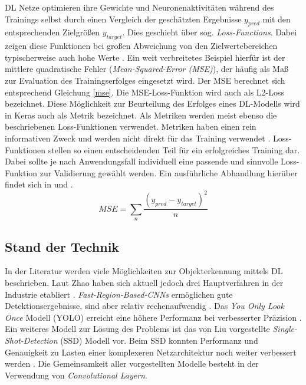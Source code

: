 DL Netze optimieren ihre Gewichte und Neuronenaktivitäten während des Trainings selbst durch einen Vergleich der geschätzten Ergebnisse $y_{pred}$ mit den entsprechenden Zielgrößen $y_{target}$. Dies geschieht über sog. \textit{Loss-Functions}. Dabei zeigen diese Funktionen bei großen Abweichung von den Zielwertebereichen typischerweise auch hohe Werte \cite[S.271-279]{Goodfellow-et-al-2016}. Ein weit verbreitetes Beispiel hierfür ist der mittlere quadratische Fehler (\textit{Mean-Squared-Error (MSE)}), der häufig als Maß zur Evaluation des Trainingserfolges eingesetzt wird. Der MSE berechnet sich entsprechend Gleichung \ref{mse}. Die MSE-Loss-Funktion wird auch als L2-Loss bezeichnet. Diese Möglichkeit zur Beurteilung des Erfolges eines DL-Modells wird in Keras auch als Metrik bezeichnet. Als Metriken werden meist ebenso die beschriebenen Loss-Funktionen verwendet. Metriken haben einen rein informativen Zweck und werden nicht direkt für das Training verwendet \cite{chollet2015keras}. Loss-Funktionen stellen so einen entscheidenden Teil für ein erfolgreiches Training dar. Dabei sollte je nach Anwendungsfall individuell eine passende und sinnvolle Loss-Funktion zur Validierung gewählt werden. Ein ausführliche Abhandlung hierüber findet sich in \cite{dlbook2018} und \citep{dlazure2019}.
\begin{equation}\label{mse}
	MSE=\sum_{n} \frac{(y_{pred}-y_{target})^2}{n}
\end{equation}

\subsection{Stand der Technik}

In der Literatur werden viele Möglichkeiten zur Objekterkennung mittels DL beschrieben. Laut Zhao haben sich aktuell jedoch drei Hauptverfahren in der Industrie etabliert \cite{Detection2019}. \textit{Fast-Region-Based-CNNs} ermöglichen gute Detektionsergebnisse, sind aber relativ rechenaufwendig \cite{Girshick2015}. Das \textit{You Only Look Once} Modell (YOLO) erreicht eine höhere Performanz bei verbesserter Präzision \cite{Redmon2016}. Ein weiteres Modell zur Lösung des Problems ist das von Liu vorgestellte \textit{Single-Shot-Detection} (SSD) Modell vor. Beim SSD konnten Performanz und Genauigkeit zu Lasten einer komplexeren Netzarchitektur noch weiter verbessert werden \cite{Liu2016}. Die Gemeinsamkeit aller vorgestellten Modelle besteht in der Verwendung von \textit{Convolutional Layern}.